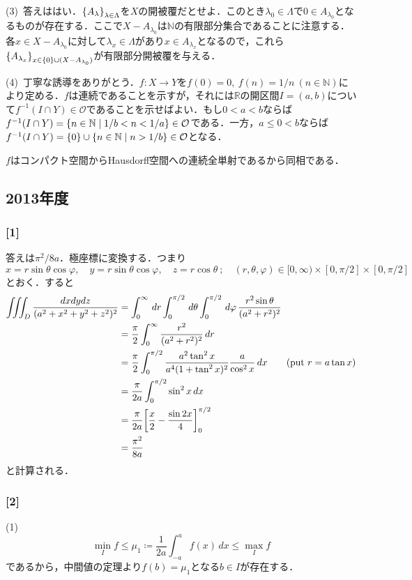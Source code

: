 \documentclass[a4j]{ltjsarticle}
\newcommand{\Rset}{\mathbb{R}}
\newcommand{\Nset}{\mathbb{N}}
\newcommand{\1}{\mathbbm{1}}
\numberwithin{equation}{section}
\theoremstyle{definition}
\begin{document}
(3)\ 答えははい．$\qty{A_\lambda}_{\lambda\in\Lambda}$を$X$の開被覆だとせよ．このとき$\lambda_0\in\Lambda$で$0\in A_{\lambda_0}$となるものが存在する．ここで$X-A_{\lambda_0}$は$\Nset$の有限部分集合であることに注意する．各$x\in X-A_{\lambda_0}$に対して$\lambda_x\in\Lambda$があり$x\in A_{\lambda_x}$となるので，これら$\qty{A_{\lambda_x}}_{x\in \qty{0}\cup (X-A_{\lambda_0})}$が有限部分開被覆を与える．

(4)\ 丁寧な誘導をありがとう．$f\colon X\to Y$を$f(0)=0,\ f(n)=1/n\ (n\in\Nset)$により定める．$f$は連続であることを示すが，それには$\Rset$の開区間$I=(a,b)$について$f^{-1}(I\cap Y)\in\mathcal{O}$であることを示せばよい．もし$0<a<b$ならば$f^{-1}(I\cap Y)=\qty{n\in\Nset \mid 1/b<n<1/a}\in\mathcal{O}$である．一方，$a\leq 0<b$ならば$f^{-1}(I\cap Y)=\qty{0}\cup \qty{n\in\Nset\mid n>1/b}\in\mathcal{O}$となる．

$f$はコンパクト空間からHausdorff空間への連続全単射であるから同相である．
\subsection{2013年度}
\subsubsection*{[1]}答えは$\pi^2/8a$．極座標に変換する．つまり
\begin{equation}
    x=r\sin\theta\cos\varphi,\quad y=r\sin\theta\cos\varphi,\quad z=r\cos\theta\ ;\quad (r,\theta,\varphi)\in [0,\infty)\times [0,\pi/2]\times [0,\pi/2]
\end{equation}
とおく．すると
\begin{align}
    \iiint_{D}\frac{dxdydz}{(a^2+x^2+y^2+z^2)^2}&=\int_0^\infty\,dr \int_0^{\pi/2}\,d\theta\int_0^{\pi/2}\,d\varphi\,\frac{r^2\sin\theta}{(a^2+r^2)^2}\\
    &=\frac{\pi}{2}\int_{0}^\infty\frac{r^2}{(a^2+r^2)^2}\,dr\\
    &=\frac{\pi}{2}\int_{0}^{\pi/2}\frac{a^2\tan^2 x}{a^4(1+\tan^2x)^2}\frac{a}{\cos^2 x}\,dx\qquad(\text{put $r=a\tan x$})\\
    &=\frac{\pi}{2a}\int_{0}^{\pi/2}\sin^2 x\,dx\\
    &=\frac{\pi}{2a}\qty[\frac{x}{2}-\frac{\sin 2x}{4}]_0^{\pi/2}\\
    &=\frac{\pi^2}{8a}
\end{align}
と計算される．
\subsubsection*{[2]}
(1) 
\begin{equation}
    \min_{I}f\leq \mu_1\coloneq \frac{1}{2a}\int_{-a}^a f(x)\,dx \leq \max_{I}f
\end{equation}
であるから，中間値の定理より$f(b)=\mu_1$となる$b\in I$が存在する．
\end{document}
